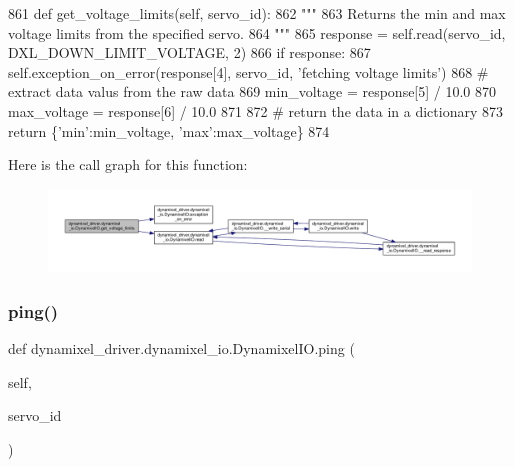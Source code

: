 \begin{DoxyCode}
861     \textcolor{keyword}{def }get\_voltage\_limits(self, servo\_id):
862         \textcolor{stringliteral}{"""}
863 \textcolor{stringliteral}{        Returns the min and max voltage limits from the specified servo.}
864 \textcolor{stringliteral}{        """}
865         response = self.read(servo\_id, DXL\_DOWN\_LIMIT\_VOLTAGE, 2)
866         \textcolor{keywordflow}{if} response:
867             self.exception\_on\_error(response[4], servo\_id, \textcolor{stringliteral}{'fetching voltage limits'})
868         \textcolor{comment}{# extract data valus from the raw data}
869         min\_voltage = response[5] / 10.0
870         max\_voltage = response[6] / 10.0
871 
872         \textcolor{comment}{# return the data in a dictionary}
873         \textcolor{keywordflow}{return} \{\textcolor{stringliteral}{'min'}:min\_voltage, \textcolor{stringliteral}{'max'}:max\_voltage\}
874 
\end{DoxyCode}
Here is the call graph for this function\+:
\nopagebreak
\begin{figure}[H]
\begin{center}
\leavevmode
\includegraphics[width=350pt]{dd/d77/classdynamixel__driver_1_1dynamixel__io_1_1_dynamixel_i_o_ab11d3c841d1e858f350c2c2e32f10ec3_cgraph}
\end{center}
\end{figure}
\mbox{\label{classdynamixel__driver_1_1dynamixel__io_1_1_dynamixel_i_o_a6a992742790d35953761eeb20275563a}} 
\subsubsection{\texorpdfstring{ping()}{ping()}}
{\footnotesize\ttfamily def dynamixel\+\_\+driver.\+dynamixel\+\_\+io.\+Dynamixel\+I\+O.\+ping (\begin{DoxyParamCaption}\item[{}]{self,  }\item[{}]{servo\+\_\+id }\end{DoxyParamCaption})}

